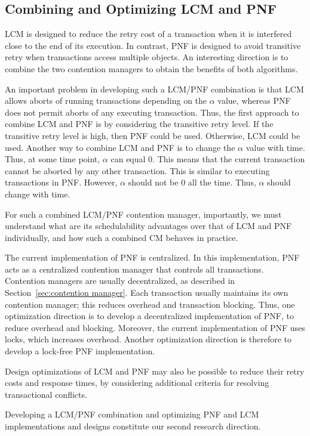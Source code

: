 \documentclass[12pt,english]{report}
\begin{document}
\subsection{Combining and Optimizing LCM and PNF} 

LCM is designed to reduce the retry cost of a transaction when it is interfered close to the end of its execution. In contrast, PNF is designed to avoid transitive retry when transactions access multiple objects. An interesting direction is to combine the two contention managers to obtain the benefits of both algorithms. 

An important problem in developing such a LCM/PNF combination is that LCM allows aborts of running transactions depending on the $\alpha$ value, whereas PNF does not permit aborts of any executing transaction. Thus, the first approach to combine LCM and PNF is by considering the transitive retry level. If the transitive retry level is high, then PNF could be used. Otherwise, LCM could be used. Another way to combine LCM and PNF is to change the $\alpha$ value with time. Thus, at some time point, $\alpha$ can equal $0$. This means that the current transaction cannot be aborted by any other transaction. This is similar to executing transactions in PNF. However, $\alpha$ should not be $0$ all the time. Thus, $\alpha$ should change with time.

For such a combined LCM/PNF contention manager, importantly, we must  understand what are its schedulability advantages over that of LCM and PNF individually, and how such a combined CM behaves in practice. 


The current implementation of PNF is centralized. In this implementation, PNF acts as a centralized contention manager that controls all transactions. Contention managers are usually decentralized, as described in Section~\ref{sec:contention manager}. Each transaction usually maintains its own contention manager; this reduces overhead and transaction blocking. Thus, one optimization direction is to develop a decentralized implementation of PNF, to reduce overhead and blocking. Moreover, the current implementation of PNF uses locks, which increases overhead. Another optimization direction is therefore to develop a lock-free PNF implementation.


Design optimizations of LCM and PNF may also be possible to reduce their retry costs and response times, by considering additional criteria for resolving transactional conflicts. 

Developing a LCM/PNF combination and optimizing PNF and LCM implementations and designs constitute  our second research direction. 
\end{document}
